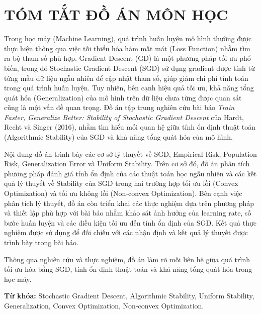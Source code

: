 \chapter*{TÓM TẮT ĐỒ ÁN MÔN HỌC}
\vspace*{1.5ex}

Trong học máy (Machine Learning), quá trình huấn luyện mô hình thường được thực hiện thông qua việc tối thiểu hóa hàm mất mát (Loss Function) nhằm tìm ra bộ tham số phù hợp. Gradient Descent (GD) là một phương pháp tối ưu phổ biến, trong đó Stochastic Gradient Descent (SGD) sử dụng gradient được tính từ từng mẫu dữ liệu ngẫu nhiên để cập nhật tham số, giúp giảm chi phí tính toán trong quá trình huấn luyện. Tuy nhiên, bên cạnh hiệu quả tối ưu, khả năng tổng quát hóa (Generalization) của mô hình trên dữ liệu chưa từng được quan sát cũng là một vấn đề quan trọng. Đồ án tập trung nghiên cứu bài báo \textit{Train Faster, Generalize Better: Stability of Stochastic Gradient Descent} của Hardt, Recht và Singer (2016), nhằm tìm hiểu mối quan hệ giữa tính ổn định thuật toán (Algorithmic Stability) của SGD và khả năng tổng quát hóa của mô hình.

Nội dung đồ án trình bày các cơ sở lý thuyết về SGD, Empirical Risk, Population Risk, Generalization Error và Uniform Stability. Trên cơ sở đó, đồ án phân tích phương pháp đánh giá tính ổn định của các thuật toán học ngẫu nhiên và các kết quả lý thuyết về Stability của SGD trong hai trường hợp tối ưu lồi (Convex Optimization) và tối ưu không lồi (Non-convex Optimization). Bên cạnh việc phân tích lý thuyết, đồ án còn triển khai các thực nghiệm dựa trên phương pháp và thiết lập phù hợp với bài báo nhằm khảo sát ảnh hưởng của learning rate, số bước huấn luyện và các điều kiện tối ưu đến tính ổn định của SGD. Kết quả thực nghiệm được sử dụng để đối chiếu với các nhận định và kết quả lý thuyết được trình bày trong bài báo.

Thông qua nghiên cứu và thực nghiệm, đồ án làm rõ mối liên hệ giữa quá trình tối ưu hóa bằng SGD, tính ổn định thuật toán và khả năng tổng quát hóa trong học máy.

\textbf{Từ khóa:} Stochastic Gradient Descent, Algorithmic Stability, Uniform Stability, Generalization, Convex Optimization, Non-convex Optimization.